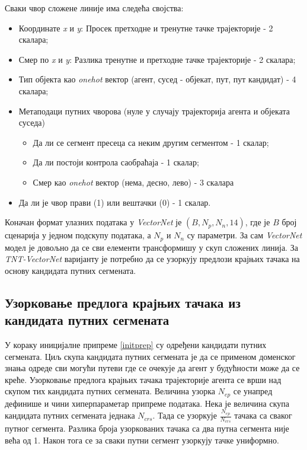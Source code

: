 \documentclass[11pt,oneside]{memoir}
\begin{document}
\noindent Сваки чвор сложене линије има следећа својства:
\begin{itemize}
  \item Координате \textit{x} и \textit{y}: Просек претходне и тренутне тачке трајекторије - 2 скалара;
  \item Смер по \textit{x} и \textit{y}: Разлика тренутне и претходне тачке трајекторије - 2 скалара;
  \item Тип објекта као \textit{onehot} вектор (агент, сусед - објекат, пут, пут кандидат) - 4 скалара;
  \item Метаподаци путних чворова (нуле у случају трајекторија агента и објеката суседа)
    \begin{itemize}
      \item Да ли се сегмент пресеца са неким другим сегментом - 1 скалар;
      \item Да ли постоји контрола саобраћаја - 1 скалар;
      \item Смер као \textit{onehot} вектор (нема, десно, лево) - 3 скалара
    \end{itemize}
  \item Да ли је чвор прави (1) или вештачки (0) - 1 скалар.
\end{itemize}

Коначан формат улазних података у \textit{VectorNet} је $(B, N_{p}, N_{n}, 14)$, где је $B$ број сценарија у једном подскупу података,
а $N_{p}$ и $N_{n}$ су параметри. За сам \textit{VectorNet} модел је довољно да се сви елементи трансформишу у скуп сложених линија. За
\textit{TNT-VectorNet} варијанту је потребно да се узоркују предлози крајњих тачака на основу кандидата путних сегмената. 

\subsection{Узорковање предлога крајњих тачака из кандидата путних сегмената}

У кораку иницијалне припреме \ref{initprep} су одређени кандидати путних сегмената. Циљ скупа кандидата путних сегмената је да се применом доменског знања
одреде сви могући путеви где се очекује да агент у будућности може да се креће. Узорковање предлога крајњих тачака трајекторије агента се врши над
скупом тих кандидата путних сегмената. Величина узорка $N_{ep}$ се унапред дефинише и чини хиперпараметар припреме података. Нека је величина скупа
кандидата путних сегмената једнака $N_{crs}$. Тада се узоркује $\frac{N_{ep}}{N_{crs}}$ тачака са сваког путног сегмента. Разлика броја
узоркованих тачака са два путна сегмента није већа од 1. Након тога се за сваки путни сегмент узоркују тачке униформно. 
\end{document}
